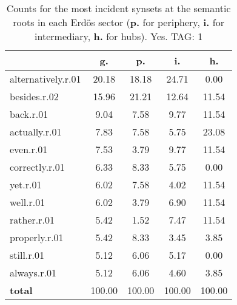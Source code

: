 \begin{table}[h!]
\begin{center}
\begin{tabular}{| l | c | c | c | c |}\hline
 & g. & p. & i. & h. \\\hline
alternatively.r.01 & 20.18  & 18.18  & 24.71  & 0.00 \\\hline
besides.r.02 & 15.96  & 21.21  & 12.64  & 11.54 \\\hline
back.r.01 & 9.04  & 7.58  & 9.77  & 11.54 \\\hline
actually.r.01 & 7.83  & 7.58  & 5.75  & 23.08 \\\hline
even.r.01 & 7.53  & 3.79  & 9.77  & 11.54 \\\hline
correctly.r.01 & 6.33  & 8.33  & 5.75  & 0.00 \\\hline
yet.r.01 & 6.02  & 7.58  & 4.02  & 11.54 \\\hline
well.r.01 & 6.02  & 3.79  & 6.90  & 11.54 \\\hline
rather.r.01 & 5.42  & 1.52  & 7.47  & 11.54 \\\hline
properly.r.01 & 5.42  & 8.33  & 3.45  & 3.85 \\\hline
still.r.01 & 5.12  & 6.06  & 5.17  & 0.00 \\\hline
always.r.01 & 5.12  & 6.06  & 4.60  & 3.85 \\\hline
{{\bf total}} & 100.00  & 100.00  & 100.00  & 100.00 \\\hline
\end{tabular}
\caption{Counts for the most incident synsets at the semantic roots in each Erd\"os sector ({\bf p.} for periphery, {\bf i.} for intermediary, {\bf h.} for hubs). Yes. TAG: 1}
\end{center}
\end{table}